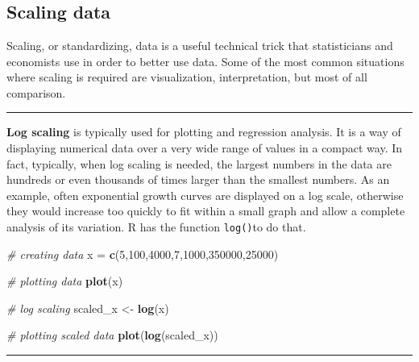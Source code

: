 \documentclass[
]{article}
\newenvironment{Shaded}{\begin{snugshade}}{\end{snugshade}}
\newcommand{\CommentTok}[1]{\textcolor[rgb]{0.56,0.35,0.01}{\textit{#1}}}
\newcommand{\DecValTok}[1]{\textcolor[rgb]{0.00,0.00,0.81}{#1}}
\newcommand{\FunctionTok}[1]{\textcolor[rgb]{0.13,0.29,0.53}{\textbf{#1}}}
\newcommand{\NormalTok}[1]{#1}
\newcommand{\OtherTok}[1]{\textcolor[rgb]{0.56,0.35,0.01}{#1}}
\begin{document}
~

~

~

\hypertarget{scaling-data}{%
\subsection{Scaling data}\label{scaling-data}}

Scaling, or standardizing, data is a useful technical trick that
statisticians and economists use in order to better use data. Some of
the most common situations where scaling is required are visualization,
interpretation, but most of all comparison.

\begin{center}\rule{0.5\linewidth}{0.5pt}\end{center}

\textbf{Log scaling} is typically used for plotting and regression analysis.
It is a way of displaying numerical data over a very wide range of
values in a compact way. In fact, typically, when log scaling is needed,
the largest numbers in the data are hundreds or even thousands of times
larger than the smallest numbers. As an example, often exponential
growth curves are displayed on a log scale, otherwise they would
increase too quickly to fit within a small graph and allow a complete
analysis of its variation. R has the function \texttt{log()}to do that.

\begin{Shaded}
\begin{Highlighting}[]
\CommentTok{\# creating data}
\NormalTok{x }\OtherTok{=} \FunctionTok{c}\NormalTok{(}\DecValTok{5}\NormalTok{,}\DecValTok{100}\NormalTok{,}\DecValTok{4000}\NormalTok{,}\DecValTok{7}\NormalTok{,}\DecValTok{1000}\NormalTok{,}\DecValTok{350000}\NormalTok{,}\DecValTok{25000}\NormalTok{)}

\CommentTok{\# plotting data}
\FunctionTok{plot}\NormalTok{(x)}

\CommentTok{\# log scaling}
\NormalTok{scaled\_x }\OtherTok{\textless{}{-}} \FunctionTok{log}\NormalTok{(x)}

\CommentTok{\# plotting scaled data}
\FunctionTok{plot}\NormalTok{(}\FunctionTok{log}\NormalTok{(scaled\_x))}
\end{Highlighting}
\end{Shaded}

\begin{center}\rule{0.5\linewidth}{0.5pt}\end{center}
\end{document}
